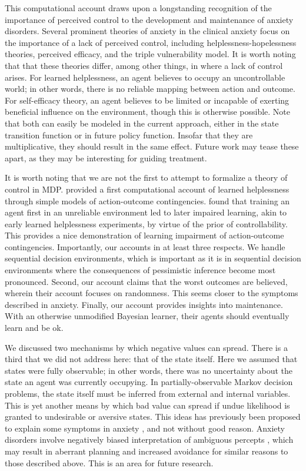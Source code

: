 \documentclass[11pt]{article} %
\begin{document}
This computational account draws upon a longstanding recognition of the importance
of perceived control to the development and maintenance of anxiety disorders. Several
prominent theories of anxiety in the clinical anxiety focus on the importance of
a lack of perceived control, including helplessness-hopelessness theories, perceived
efficacy, and the triple vulnerability model. It is worth noting that that these
theories differ, among other things, in where a lack of control arises. For learned
helplessness, an agent believes to occupy an uncontrollable world; in other words,
there is no reliable mapping between action and outcome. For self-efficacy theory,
an agent believes to be limited or incapable of exerting beneficial influence on
the environment, though this is otherwise possible. Note that both can easily be
modeled in the current approach, either in the state transition function or in
future policy function. Insofar that they are multiplicative, they should result
in the same effect. Future work may tease these apart, as they may be interesting
for guiding treatment.

It is worth noting that we are not the first to attempt to formalize a theory
of control in MDP. \cite{HuysDayan2009} provided a first computational account
of learned helplessness through simple models of action-outcome contingencies.
\cite{HuysDayan2009} found that training an agent first in an unreliable environment
led to later impaired learning, akin to early learned helplessness experiments,
by virtue of the prior of controllability. This provides a nice demonstration
of learning impairment of action-outcome contingencies. Importantly, our accounts
in at least three respects. We handle sequential decision environments, which is
important as it is in sequential decision environments where the consequences
of pessimistic inference become most pronounced. Second, our account claims
that the worst outcomes are believed, wherein their account focuses on randomness.
This seems closer to the symptoms described in anxiety. Finally, our account
provides insights into maintenance. With an otherwise unmodified Bayesian learner,
their agents should eventually learn and be ok.

We discussed two mechanisms by which negative values can spread. There is a third
that we did not address here: that of the state itself. Here we assumed that states
were fully observable; in other words, there was no uncertainty about the state
an agent was currently occupying. In partially-observable Markov decision problems,
the state itself must be inferred from external and internal variables. This is
yet another means by which bad value can spread if undue likelihood is granted
to undesirable or aversive states. This ideas has previously been proposed to
explain some symptoms in anxiety \citep{Paulus2012}, and not without good reason.
Anxiety disorders involve negatively biased interpretation of ambiguous percepts
\citep{Hartley2012}, which may result in aberrant planning and increased avoidance
for similar reasons to those described above. This is an area for future research.
\end{document}
